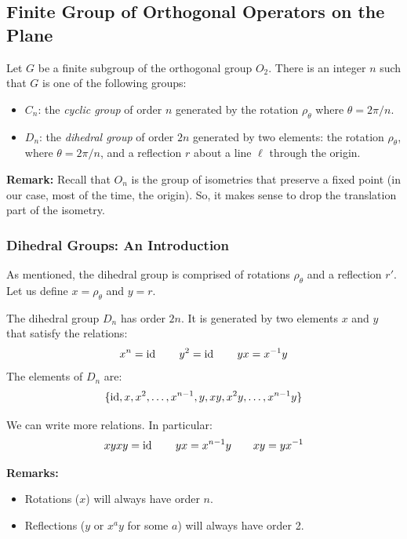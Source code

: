 \documentclass[letterpaper]{article}
\begin{document}
\subsection{Finite Group of Orthogonal Operators on the Plane}
\begin{theorem}{}{}
    Let $G$ be a finite subgroup of the orthogonal group $O_2$. There is an integer $n$ such that $G$ is one of the following groups: 
    \begin{itemize}
        \item $C_n$: the \emph{cyclic group} of order $n$ generated by the rotation $\rho_{\theta}$ where $\theta = 2\pi / n$. 
        \item $D_n$: the \emph{dihedral group} of order $2n$ generated by two elements: the rotation $\rho_{\theta}$, where $\theta = 2\pi / n$, and a reflection $r$ about a line $\ell$ through the origin. 
    \end{itemize}
\end{theorem}
\textbf{Remark:} Recall that $O_n$ is the group of isometries that preserve a fixed point (in our case, most of the time, the origin). So, it makes sense to drop the translation part of the isometry. 

\subsubsection{Dihedral Groups: An Introduction}
As mentioned, the dihedral group is comprised of rotations $\rho_{\theta}$ and a reflection $r'$. Let us define $x = \rho_{\theta}$ and $y = r$. 

\begin{mdframed}
    \begin{proposition}
        The dihedral group $D_n$ has order $2n$. It is generated by two elements $x$ and $y$ that satisfy the relations: 
        \[x^n = \operatorname{id} \qquad y^2 = \operatorname{id} \qquad yx = x^{-1} y\]
        The elements of $D_n$ are: 
        \[\{\operatorname{id}, x, x^2, \dots, x^{n - 1}, y, xy, x^{2}y, \dots, x^{n - 1}y\}\]
    \end{proposition}
\end{mdframed}
We can write more relations. In particular: 
\[xyxy = \operatorname{id} \qquad yx = x^{n - 1}y \qquad xy = yx^{-1}\]

\textbf{Remarks:} 
\begin{itemize}
    \item Rotations ($x$) will always have order $n$. 
    \item Reflections ($y$ or $x^a y$ for some $a$) will always have order 2. 
\end{itemize}
\end{document}
